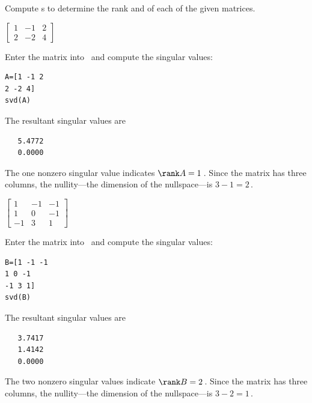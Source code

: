 \begin{example} 
Compute \svd{}s to determine the rank and  of each of the given matrices.
\begin{Parts}

\item \(\begin{bmatrix} 1&-1&2
\\2&-2&4
 \end{bmatrix}\)
\begin{solution} 
Enter the matrix into \script\ and compute the singular values:
\begin{verbatim}
A=[1 -1 2
2 -2 4]
svd(A)
\end{verbatim}
\setbox\ajrqrbox\hbox{}%
\marginajrbox%
The resultant singular values are
\begin{verbatim}
   5.4772
   0.0000
\end{verbatim}
The one nonzero singular value indicates \(\rank A=1\)\,.
Since the matrix has three columns, the nullity---the dimension of the nullspace---is \(3-1=2\)\,. 
\end{solution}

 
\item \(\begin{bmatrix} 1&-1&-1
\\1&0&-1
\\-1&3&1 \end{bmatrix}\)
\begin{solution} 
Enter the matrix into \script\ and compute the singular values:
\begin{verbatim}
B=[1 -1 -1
1 0 -1
-1 3 1]
svd(B)
\end{verbatim}
\setbox\ajrqrbox\hbox{}%
\marginajrbox%
The resultant singular values are
\begin{verbatim}
   3.7417
   1.4142
   0.0000
\end{verbatim}
The two nonzero singular values indicate  \(\rank B=2\)\,.
Since the matrix has three columns, the nullity---the dimension of the nullspace---is \(3-2=1\)\,. 
\end{solution}



\end{Parts}
\end{example}
